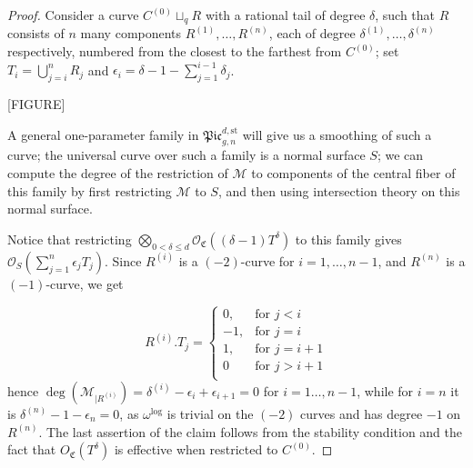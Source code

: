 \documentclass[11pt]{amsart}
\theoremstyle{plain}
\theoremstyle{definition}
\begin{document}
\begin{proof}

Consider a curve $C^{(0)}\sqcup_q R$ with a rational tail of degree $\delta$, such that $R$ consists of $n$ many components $R^{(1)
},\ldots,R^{(n)}$, each of degree $\delta^{(1)},\ldots,\delta^{(n)}$ respectively, numbered from the closest to the farthest from $C^{(0)}$; set $T_i=\bigcup_{j=i}^n R_j$ and $\epsilon_i=\delta-1-\sum_{j=1}^{i-1}\delta_j$.

[FIGURE]

A general one-parameter family in $\mathfrak{Pic}_{g,n}^{d,\text{st}}$ will give us a smoothing of such a curve; the universal curve over such a family is a normal surface $S$; we can compute the degree of the restriction of $\mathcal M$ to components of the central fiber of this family by first restricting $\mathcal M$ to $S$, and then using intersection theory on this normal surface.

Notice that restricting $\bigotimes_{0<\delta\leq d}\mathcal O_{\mathfrak C}((\delta-1) T^\delta)$ to this family gives $\mathcal O_S(\sum_{j=1}^n\epsilon_jT_j)$. Since $R^{(i)}$ is a $(-2)$-curve for $i=1,\ldots,n-1$, and $R^{(n)}$ is a $(-1)$-curve, we get

\[
  R^{(i)}.T_j =
  \begin{cases}
    0, & \text{for } j<i \\
    -1, & \text{for } j=i \\
    1, & \text{for } j=i+1 \\
    0 & \text{for } j>i+1 \\
  \end{cases}
\]
hence $\deg(\mathcal M_{|R^{(i)}})=\delta^{(i)}-\epsilon_i+\epsilon_{i+1}=0$ for $i=1\ldots,n-1$, while for $i=n$ it is $\delta^{(n)}-1-\epsilon_n=0$, as $\omega^{\text{log}}$ is trivial on the $(-2)$ curves and has degree $-1$ on $R^{(n)}$. The last assertion of the claim follows from the stability condition and the fact that $O_{\mathfrak C}(T^\delta)$ is effective when restricted to $C^{(0)}$.
\end{proof}
\end{document}
